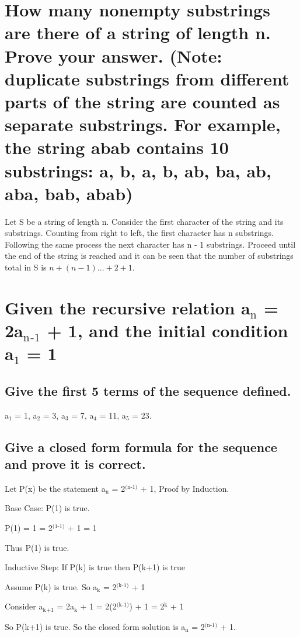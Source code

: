 \documentclass[11pt]{article}
\begin{document}
\section{How many nonempty substrings are there of a string of length n. Prove your answer. (Note: duplicate substrings from different parts of the string are counted as separate substrings. For example, the string abab contains 10 substrings: a, b, a, b, ab, ba, ab, aba, bab, abab)}
\label{sec:org189c014}
\quad Let S be a string of length n. Consider the first character of the string and its substrings. Counting from right to left, the first character has n substrings. Following the same process the next character has n - 1 substrings. Proceed until the end of the string is reached and it can be seen that the number of substrings total in S is \(n + (n - 1) ... + 2 + 1\). 
\section{Given the recursive relation a\(_{\text{n}}\) = 2a\(_{\text{n}}\)\(_{\text{-1}}\) + 1, and the initial condition a\(_{\text{1}}\) = 1}
\label{sec:orgb191200}
\subsection{Give the first 5 terms of the sequence defined.}
\label{sec:orgaadd292}
\quad a\(_{\text{1}}\) = 1, a\(_{\text{2}}\) = 3, a\(_{\text{3}}\) = 7, a\(_{\text{4}}\) = 11, a\(_{\text{5}}\) = 23.
\subsection{Give a closed form formula for the sequence and prove it is correct.}
\label{sec:org7e7d85b}
\quad Let P(x) be the statement a\(_{\text{n}}\) = 2\(^{\text{(n-1)}}\) + 1, Proof by Induction.\par
  Base Case: P(1) is true.\par
  P(1) = 1 = 2\(^{\text{(1-1)}}\) + 1 = 1\par
  Thus P(1) is true.\par
  Inductive Step: If P(k) is true then P(k+1) is true\par
  Assume P(k) is true. So a\(_{\text{k}}\) = 2\(^{\text{(k-1)}}\) + 1\par
  Consider a\(_{\text{k}}\)\(_{\text{+1}}\) = 2a\(_{\text{k}}\) + 1 = 2(2\(^{\text{(k-1)}}\)) + 1 = 2\(^{\text{k}}\) + 1\par
  So P(k+1) is true. So the closed form solution is a\(_{\text{n}}\) = 2\(^{\text{(n-1)}}\) + 1.
\end{document}

